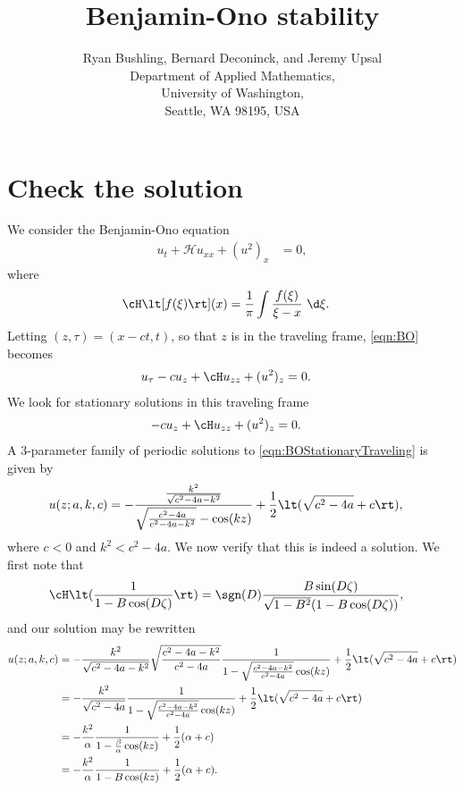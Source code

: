 \documentclass[a4paper,10pt]{article}
\title{Benjamin-Ono stability}
\author{Ryan Bushling, Bernard Deconinck, and Jeremy Upsal
  \\
Department of Applied Mathematics,\\
University of Washington,\\
Seattle, WA 98195, USA}
\begin{document}
\maketitle

\section{Check the solution}

We consider the Benjamin-Ono equation
\begin{align}
  u_t + \mathcal{H}u_{xx} + (u^2)_x &=0,\label{eqn:BO}
\end{align}
where
\begin{align}
  \cH \lt[f(\xi)\rt](x) &= \frac1\pi \int \frac{f(\xi)}{\xi - x}~\d \xi.
\end{align}
Letting $(z,\tau) = (x-ct, t)$, so that $z$ is in the traveling frame,
\eqref{eqn:BO} becomes
\begin{align}
  u_\tau - cu_z + \cH u_{zz} + (u^2)_z &=0.\label{eqn:BOtravel}
\end{align}
We look for stationary solutions in this traveling frame
\begin{align}
  -c u_z + \cH u_{zz} + (u^2)_z &=0. \label{eqn:BOStationaryTraveling}
\end{align}
A 3-parameter family of periodic solutions to \eqref{eqn:BOStationaryTraveling}
is \cite{bronski2016modulational} given by
\begin{align}
  u(z; a, k, c) &=
  -\frac{\frac{k^2}{\sqrt{c^2-4a-k^2}}}{\sqrt{\frac{c^2-4a}{c^2-4a-k^2}} -
  \cos(kz)} + \frac12 \lt(\sqrt{c^2-4a}+c\rt),
  \label{eqn:BOsoln}
\end{align}
where $c<0$ and $k^2<c^2-4a$.  We now verify that this is indeed a solution. We
first note that \cite{ono1975}
\begin{align}
	\cH \lt(\frac{1}{1-B\cos(D\zeta)}\rt) &= \sgn(D) \frac{B
	\sin(D\zeta)}{\sqrt{1-B^2}(1-B\cos(D\zeta))},
\end{align}
and our solution may be rewritten
\begin{align}
   u(z;a,k,c) &= -\frac{k^2}{\sqrt{c^2-4a-k^2}} \sqrt{\frac{c^2-4a-k^2}{c^2-4a}}
   \frac{1}{ 1 - \sqrt{\frac{c^2-4a-k^2}{c^2-4a}}\cos(kz)} + \frac12
   \lt(\sqrt{c^2-4a}+c\rt)\\
   &= -\frac{k^2}{\sqrt{c^2-4a}}
   \frac{1}{ 1 - \sqrt{\frac{c^2-4a-k^2}{c^2-4a}}\cos(kz)} + \frac12
   \lt(\sqrt{c^2-4a}+c\rt)\\
   &= -\frac{k^2}{\alpha}\frac{1}{1-\frac{\beta}{\alpha}\cos(kz)} + \frac12(\alpha + c)\\
   &= -\frac{k^2}{\alpha}\frac{1}{1-B \cos (k z)} + \frac12( \alpha + c).
   \label{eqn:soln}
\end{align}
\end{document}
